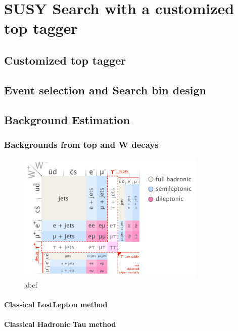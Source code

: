 \chapter{SUSY Search with a customized top tagger}

\section{Customized top tagger}

\section{Event selection and Search bin design}

\section{Background Estimation}

\subsection{Backgrounds from top and W decays}
\begin{figure}[htbp]
 \begin{center}
  \includegraphics[width=0.8\textwidth]{figures/c4/c4_top_w_decaymod.png}
 \end{center}
 \caption{abcf}
 \label{fig:c4twdecaymod}
\end{figure}

\subsubsection{Classical LostLepton method}
\subsubsection{Classical Hadronic Tau method}
